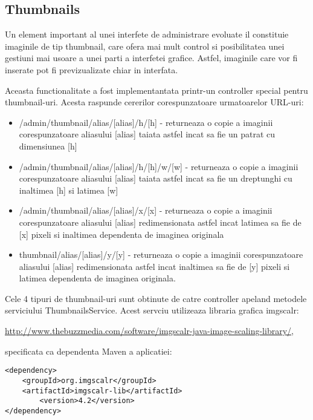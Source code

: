 \subsection{Thumbnails}

Un element important al unei interfete de administrare evoluate il constituie imaginile de tip thumbnail, care ofera mai mult control si posibilitatea unei gestiuni mai usoare a unei parti a interfetei grafice. Astfel, imaginile care vor fi inserate pot fi previzualizate chiar in interfata.

Aceasta functionalitate a fost implementantata printr-un controller special pentru thumbnail-uri. Acesta raspunde cererilor corespunzatoare urmatoarelor URL-uri:

\begin{itemize}
\item{/admin/thumbnail/alias/[alias]/h/[h] - returneaza o copie a imaginii corespunzatoare aliasului [alias] taiata astfel incat sa fie un patrat cu dimensiunea [h]}

\item{/admin/thumbnail/alias/[alias]/h/[h]/w/[w] - returneaza o copie a imaginii corespunzatoare aliasului [alias] taiata astfel incat sa fie un dreptunghi cu inaltimea [h] si latimea [w]}

\item{/admin/thumbnail/alias/[alias]/x/[x] - returneaza o copie a imaginii corespunzatoare aliasului [alias] redimensionata astfel incat latimea sa fie de [x] pixeli si inaltimea dependenta de imaginea originala}

\item{thumbnail/alias/[alias]/y/[y] - returneaza o copie a imaginii corespunzatoare aliasului [alias] redimensionata astfel incat inaltimea sa fie de [y] pixeli si latimea dependenta de imaginea originala.}

\end{itemize}

Cele 4 tipuri de thumbnail-uri sunt obtinute de catre controller apeland metodele serviciului ThumbnailsService. Acest servciu utilizeaza libraria grafica imgscalr:

\url{http://www.thebuzzmedia.com/software/imgscalr-java-image-scaling-library/}, 

specificata ca dependenta Maven a aplicatiei:

\begin{lstlisting}[breaklines=true]
<dependency>
	<groupId>org.imgscalr</groupId>
	<artifactId>imgscalr-lib</artifactId>
    	<version>4.2</version> 
</dependency> 
\end{lstlisting}	

